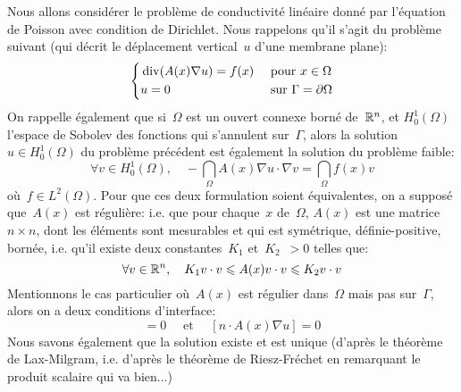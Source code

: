 Nous allons considérer le problème de conductivité linéaire donné par l'équation de Poisson avec condition de Dirichlet. Nous rappelons qu'il s'agit du problème suivant (qui décrit le déplacement vertical~$u$ d'une membrane plane):
\begin{equation}
\left\{
\begin{aligned}
&\operatorname{div}(A(x)\nabla u) = f(x)&&\text{ pour } x\in\Omega\\
&u=0 &&\text{ sur } \Gamma=\partial\Omega
\end{aligned}
\right.
\end{equation}
On rappelle également que si~$\Omega$ est un ouvert connexe borné de~$\mathbb R^n$, et $H_0^1(\Omega)$ l'espace de Sobolev des fonctions qui s'annulent sur~$\Gamma$, alors la solution $u\in H_0^1(\Omega)$ du problème précédent est également la solution du problème faible:
\begin{equation}
\forall v\in H_0^1(\Omega),\quad -\dint_\Omega A(x)\nabla u\cdot\nabla v = \dint_\Omega f(x)v
\end{equation}
où~$f\in L^2(\Omega)$.
Pour que ces deux formulation soient équivalentes, on a supposé que~$A(x)$ est régulière: i.e. que pour chaque~$x$ de~$\Omega$, $A(x)$ est une matrice~$n\times n$, dont les éléments sont mesurables et qui est symétrique, définie-positive, bornée, i.e. qu'il existe deux constantes~$K_1$ et~$K_2$~$>0$ telles que:
\begin{equation}\forall v\in\mathbb R^n,\quad K_1 v\cdot v \leqslant A(x) v\cdot v \leqslant K_2 v\cdot v\end{equation}
Mentionnons le cas particulier où~$A(x)$ est régulier dans~$\Omega$ mais pas sur~$\Gamma$, alors on a deux conditions d'interface:
\begin{equation}
[u]=0 \quad\text{ et }\quad [n\cdot A(x)\nabla u]=0
\end{equation}
Nous savons également que la solution existe et est unique (d'après le théorème de Lax-Milgram, i.e. d'après le théorème de Riesz-Fréchet en remarquant le produit scalaire qui va bien...)

